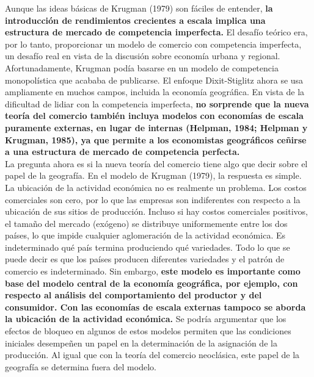 Aunque las ideas básicas de Krugman (1979) son fáciles de entender, \textbf{la introducción de rendimientos crecientes a escala implica una estructura de mercado de competencia imperfecta.} El desafío teórico era, por lo tanto, proporcionar un modelo de comercio con competencia imperfecta, un desafío real en vista de la discusión sobre economía urbana y regional. Afortunadamente, Krugman podía basarse en un modelo de competencia monopolística que acababa de publicarse. El enfoque Dixit-Stiglitz ahora se usa ampliamente en muchos campos, incluida la economía geográfica. En vista de la dificultad de lidiar con la competencia imperfecta, \textbf{no sorprende que la nueva teoría del comercio también incluya modelos con economías de escala puramente externas, en lugar de internas (Helpman, 1984; Helpman y Krugman, 1985), ya que permite a los economistas geográficos ceñirse a una estructura de mercado de competencia perfecta.}\\
La pregunta ahora es si la nueva teoría del comercio tiene algo que decir sobre el papel de la geografía. En el modelo de Krugman (1979), la respuesta es simple. La ubicación de la actividad económica no es realmente un problema. Los costos comerciales son cero, por lo que las empresas son indiferentes con respecto a la ubicación de sus sitios de producción. Incluso si hay costos comerciales positivos, el tamaño del mercado (exógeno) se distribuye uniformemente entre los dos países, lo que impide cualquier aglomeración de la actividad económica. Es indeterminado qué país termina produciendo qué variedades. Todo lo que se puede decir es que los países producen diferentes variedades y el patrón de comercio es indeterminado. Sin embargo, \textbf{este modelo es importante como base del modelo central de la economía geográfica, por ejemplo, con respecto al análisis del comportamiento del productor y del consumidor. Con las economías de escala externas tampoco se aborda la ubicación de la actividad económica.} Se podría argumentar que los efectos de bloqueo en algunos de estos modelos permiten que las condiciones iniciales desempeñen un papel en la determinación de la asignación de la producción. Al igual que con la teoría del comercio neoclásica, este papel de la geografía se determina fuera del modelo.

